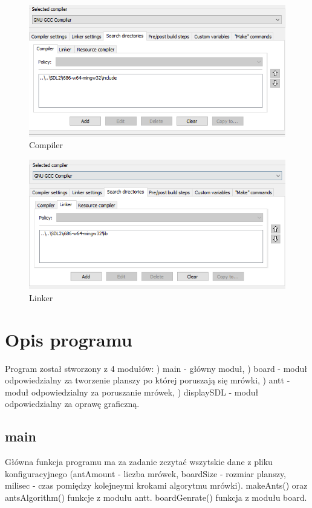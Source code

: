 \documentclass{article}
\begin{document}
\begin{figure}[ht]
\centering
\includegraphics[scale=0.4]{include}
\caption{Compiler}
\label{fig:include}
\end{figure}

\begin{figure}[ht]
\centering
\includegraphics[scale=0.4]{lib}
\caption{Linker}
\label{fig:lib}
\end{figure}



\newpage

\section{Opis programu}
Program został stworzony z 4 modułów:
) main - główny moduł,
) board - moduł odpowiedzialny za tworzenie planszy po której poruszają się mrówki,
) antt - moduł odpowiedzialny za poruszanie mrówek,
) displaySDL - moduł odpowiedzialny za oprawę graficzną.

\subsection{main}
Główna funkcja programu ma za zadanie zczytać wszytskie dane z pliku konfiguracyjnego (antAmount - liczba mrówek, boardSize - rozmiar planszy, milisec - czas pomiędzy kolejneymi krokami algorytmu mrówki). 
\newline makeAnts() oraz antsAlgorithm() funkcje z modułu antt. boardGenrate() funkcja z modułu board.
\end{document}
